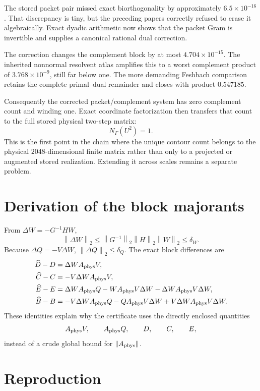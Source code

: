 \documentclass[11pt]{article}
\theoremstyle{definition}
\theoremstyle{remark}
\newcommand{\norm}[1]{\left\lVert#1\right\rVert}
\newcommand{\Aphys}{A_{\rm phys}}
\begin{document}
The stored packet pair missed exact biorthogonality by approximately
\(6.5\times10^{-16}\).  That discrepancy is tiny, but the preceding papers
correctly refused to erase it algebraically.  Exact dyadic arithmetic now
shows that the packet Gram is invertible and supplies a canonical rational
dual correction.

The correction changes the complement block by at most
\(4.704\times10^{-15}\).  The inherited nonnormal resolvent atlas amplifies
this to a worst complement product of \(3.768\times10^{-9}\), still far
below one.  The more demanding Feshbach comparison retains the complete
primal--dual remainder and closes with product \(0.547185\).

Consequently the corrected packet/complement system has zero complement
count and winding one.  Exact coordinate factorization then transfers that
count to the full stored physical two-step matrix:
\[
 N_\Gamma(U^2)=1.
\]
This is the first point in the chain where the unique contour count belongs
to the physical \(2048\)-dimensional finite matrix rather than only to a
projected or augmented stored realization.  Extending it across scales
remains a separate problem.

\appendix

\section{Derivation of the block majorants}
\label{app:majorants}

From \(\Delta W=-G^{-1}HW\),
\[
 \norm{\Delta W}_2
 \leq \norm{G^{-1}}_2\norm H_2\norm W_2
 \leq \delta_W.
\]
Because \(\Delta Q=-V\Delta W\),
\(\norm{\Delta Q}_2\leq\delta_Q\).
The exact block differences are
\begin{align*}
 \widehat D-D
 &=\Delta W\Aphys V,\\
 \widehat C-C
 &=-V\Delta W\Aphys V,\\
 \widehat E-E
 &=\Delta W\Aphys Q
   -W\Aphys V\Delta W
   -\Delta W\Aphys V\Delta W,\\
 \widehat B-B
 &=-V\Delta W\Aphys Q
   -Q\Aphys V\Delta W
   +V\Delta W\Aphys V\Delta W.
\end{align*}
These identities explain why the certificate uses the directly enclosed
quantities
\[
 \Aphys V,\qquad \Aphys Q,\qquad D,\qquad C,\qquad E,
\]
instead of a crude global bound for \(\norm{\Aphys}\).

\section{Reproduction}
\label{app:reproduction}
\end{document}
